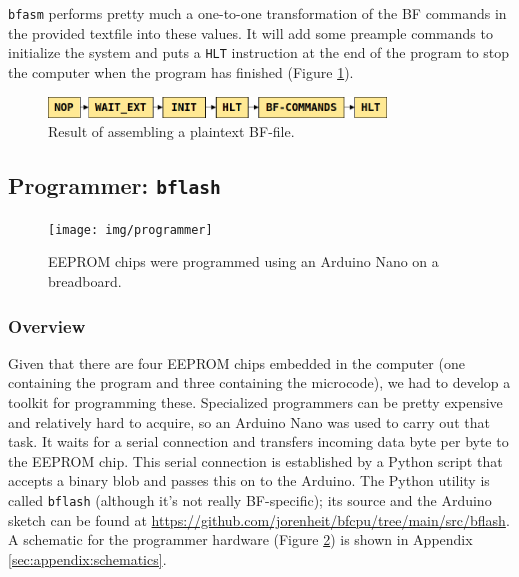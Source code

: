 \texttt{bfasm} performs pretty much a one-to-one transformation of the BF commands in the provided textfile into these values. It will add some preample commands to initialize the system and puts a \texttt{HLT} instruction at the end of the program to stop the computer when the program has finished (Figure \ref{fig:assembleoutput}).

\begin{figure}[H]
  \centering
  \includegraphics[width=0.8\textwidth]{img/assembleroutput}
  \caption{Result of assembling a plaintext BF-file.}
  \label{fig:assembleoutput}
\end{figure}


\subsection{Programmer: \texttt{bflash}} \label{sec:utilities:bflash}

\begin{figure}[H]
  \centering
  \texttt{[image: img/programmer]}
  \caption{EEPROM chips were programmed using an Arduino Nano on a breadboard.}
  \label{fig:programmer}
\end{figure}

\subsubsection{Overview}
Given that there are four EEPROM chips embedded in the computer (one containing the program and three containing the microcode), we had to develop a toolkit for programming these. Specialized programmers can be pretty expensive and relatively hard to acquire, so an Arduino Nano was used to carry out that task. It waits for a serial connection and transfers incoming data byte per byte to the EEPROM chip. This serial connection is established by a Python script that accepts a binary blob and passes this on to the Arduino. The Python utility is called \texttt{bflash} (although it's not really BF-specific); its source and the Arduino sketch can be found at \url{https://github.com/jorenheit/bfcpu/tree/main/src/bflash}. A schematic for the programmer hardware (Figure \ref{fig:programmer}) is shown in Appendix \ref{sec:appendix:schematics}.

